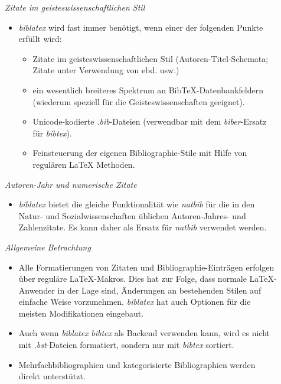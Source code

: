 \begin{description}
	\item[] \emph{Zitate im geisteswissenschaftlichen Stil}
	\begin{itemize}
		\item \emph{biblatex} wird fast immer benötigt, wenn einer der folgenden Punkte erfüllt wird:
		\begin{itemize}
			\item Zitate im geisteswissenschaftlichen Stil (Autoren-Titel-Schemata; Zitate unter Verwendung von ebd. usw.)
			\item ein wesentlich breiteres Spektrum an BibTeX-Datenbankfeldern (wiederum speziell für die Geisteswissenschaften geeignet).
			\item Unicode-kodierte \emph{.bib}-Dateien (verwendbar mit dem \emph{biber}-Ersatz für \emph{bibtex}).
			\item Feinsteuerung der eigenen Bibliographie-Stile mit Hilfe von regulären \LaTeX{} Methoden.
		\end{itemize}
	\end{itemize}
	\item[] \emph{Autoren-Jahr und numerische Zitate}
	\begin{itemize}
		\item \emph{biblatex} bietet die gleiche Funktionalität wie \emph{natbib} für die in den Natur- und Sozialwissenschaften üblichen Autoren-Jahres- und Zahlenzitate. Es kann daher als Ersatz für \emph{natbib} verwendet werden.
	\end{itemize}
	\item[] \emph{Allgemeine Betrachtung}
	\begin{itemize}
		\item Alle Formatierungen von Zitaten und Bibliographie-Einträgen erfolgen über reguläre LaTeX-Makros. Dies hat zur Folge, dass normale LaTeX-Anwender in der Lage sind, Änderungen an bestehenden Stilen auf einfache Weise vorzunehmen. \emph{biblatex} hat auch Optionen für die meisten Modifikationen eingebaut.
		\item Auch wenn \emph{biblatex} \emph{bibtex} als Backend verwenden kann, wird es nicht mit \emph{.bst}-Dateien formatiert, sondern nur mit \emph{bibtex} sortiert.
		\item Mehrfachbibliographien und kategorisierte Bibliographien werden direkt unterstützt.
	\end{itemize}
\end{description}

